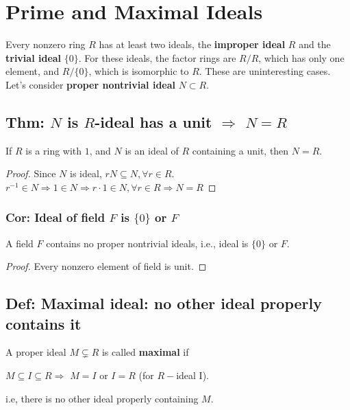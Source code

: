 \documentclass[11pt]{elegantbook}
\begin{document}
\chapter{Prime and Maximal Ideals}
Every nonzero ring $R$ has at least two ideals, the \textbf{improper ideal} $R$ and the \textbf{trivial ideal} $\{0\}$. For these ideals, the factor rings are $R/R$, which has only one element, and $R/\{0\}$, which is isomorphic to $R$. These are uninteresting cases. Let's consider \textbf{proper nontrivial ideal} $N\subset R$.

\section{Thm: $N$ is $R$-ideal has a unit $\Rightarrow$ $N=R$}
\begin{theorem}
    If $R$ is a ring with $1$, and $N$ is an ideal of $R$ containing a unit, then $N = R$.
\end{theorem}
\begin{proof}
    Since $N$ is ideal, $rN\subseteq N,\forall r\in R$. $r^{-1}\in N \Rightarrow 1\in N \Rightarrow	r\cdot 1\in N, \forall r\in R \Rightarrow N=R$
\end{proof}

\subsection{Cor: Ideal of field $F$ is $\{0\}$ or $F$}
\begin{corollary}
    A field $F$ contains no proper nontrivial ideals, i.e., ideal is $\{0\}$ or $F$.
\end{corollary}
\begin{proof}
    Every nonzero element of field is unit.
\end{proof}

\section{Def: Maximal ideal: no other ideal properly contains it}
\begin{definition}
    A proper ideal $M\subsetneq R$ is called \textbf{maximal} if
    \begin{center}
        $M\subseteq I\subseteq R \Rightarrow$ $M=I$ or $I=R$ (for $R-$ideal I).
    \end{center}
    i.e, there is no other ideal properly containing $M$.
\end{definition}
\end{document}

